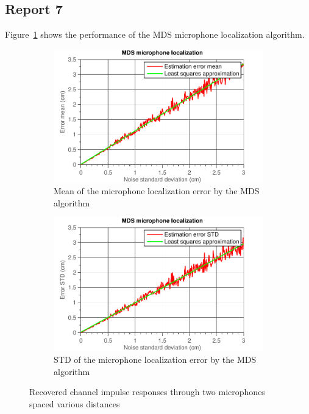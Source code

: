 \documentclass[11pt,titlepage]{report}
\begin{document}
\subsection{Report 7}
Figure~\ref{fig:ass-2-rep-7} shows the performance of the MDS microphone localization algorithm.

\begin{figure}[H]
	\begin{subfigure}{.49\textwidth}
		\includegraphics[width=\linewidth]{../../deliverable-7-resources/figures/ass-2/report-7-8/ass-2-report-7-mean.pdf}
		\caption{\centering Mean of the microphone localization error by the MDS algorithm}
	\end{subfigure}
	\begin{subfigure}{.49\textwidth}
		\includegraphics[width=\linewidth]{../../deliverable-7-resources/figures/ass-2/report-7-8/ass-2-report-7-std.pdf}
		\caption{\centering STD of the microphone localization error by the MDS algorithm}
	\end{subfigure}
	\caption{Recovered channel impulse responses through two microphones spaced various distances}
	\label{fig:ass-2-rep-7}
\end{figure}
\end{document}
